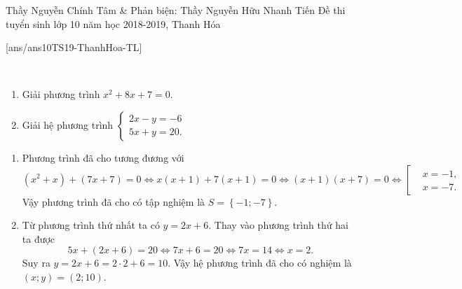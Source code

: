 \begin{name}
{Thầy Nguyễn Chính Tâm \& Phản biện: Thầy Nguyễn Hữu Nhanh Tiến}
{Đề thi tuyển sinh lớp 10 năm học 2018-2019, Thanh Hóa}
\end{name}
\setcounter{bt}{0}
[ans/ans10TS19-ThanhHoa-TL]
\begin{bt}%
~\hfill
\begin{enumerate}
	\item Giải phương trình $x^2+8x+7=0$.
	\item Giải hệ phương trình $\begin{cases}2x-y=-6\\5x+y=20. \end{cases}$
	\end{enumerate}	
	\loigiai
	{
		\begin{enumerate}
			\item Phương trình đã cho tương đương với $$(x^2+x)+(7x+7)=0\Leftrightarrow x(x+1)+7(x+1)=0\Leftrightarrow (x+1)(x+7)=0\Leftrightarrow \left[\begin{aligned} &x=-1,\\&x=-7. \end{aligned}\right.$$
Vậy phương trình đã cho có tập nghiệm là $S=\left\{-1;-7\right\}$.
			\item Từ phương trình thứ nhất ta có $y=2x+6$. Thay vào phương trình thứ hai ta được
$$5x+(2x+6)=20\Leftrightarrow 7x+6=20\Leftrightarrow 7x=14\Leftrightarrow x=2.$$
Suy ra $y=2x+6=2\cdot 2+6=10$. Vậy hệ phương trình đã cho có nghiệm là $(x;y)=(2;10)$.
		\end{enumerate}	
	}
\end{bt}

